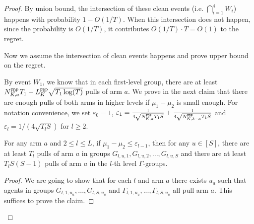 \begin{proof}
By union bound, the intersection of these clean events (i.e. $\bigcap_{i=1}^4 W_i$) happens with probability $1-O(1/T)$. When this intersection does not happen, since the probability is $O(1/T)$, it contributes $O(1/T) \cdot T = O(1)$ to the regret. 

Now we assume the intersection of clean events happens and prove upper bound on the regret.

By event $W_1$, we know that in each first-level group, there are at least $\fdpN T_1- \GdT \sqrt{T_1\log(T)}$ pulls of arm $a$. We prove in the next claim that there are enough pulls of both arms in higher levels if $\mu_1-\mu_2$ is small enough. For notation convenience, we set $\varepsilon_0 = 1$, $\varepsilon_1 = \frac{1}{4\sqrt{\fdpN T_1S}} + \frac{1}{4\sqrt{\fdpN[3-a] T_1S}}$ and $\varepsilon_l = 1/(4\sqrt{T_lS})$ for $l \geq 2$. 

\begin{claim}
\label{clm:l2_explore}
For any arm $a$ and $2\leq l \leq L$, if $\mu_1 - \mu_2 \leq \varepsilon_{l-1}$, then for any $u \in [S]$, there are at least $T_l$ pulls of arm $a$ in groups $G_{l,u,1},G_{l,u,2}, ... ,G_{l,u,S}$ and there are at least $T_lS(S-1)$ pulls of arm $a$ in the $l$-th level $\Gamma$-groups.
\end{claim}

\begin{proof}
We are going to show that for each $l$ and arm $a$ there exists $u_a$ such that agents in groups $G_{l,1,u_a},...,G_{l,S,u_a}$ and $\Gamma_{l,1,u_a},...,\Gamma_{l,S,u_a}$ all pull arm $a$. This suffices to prove the claim.


\end{proof}
\end{proof}
